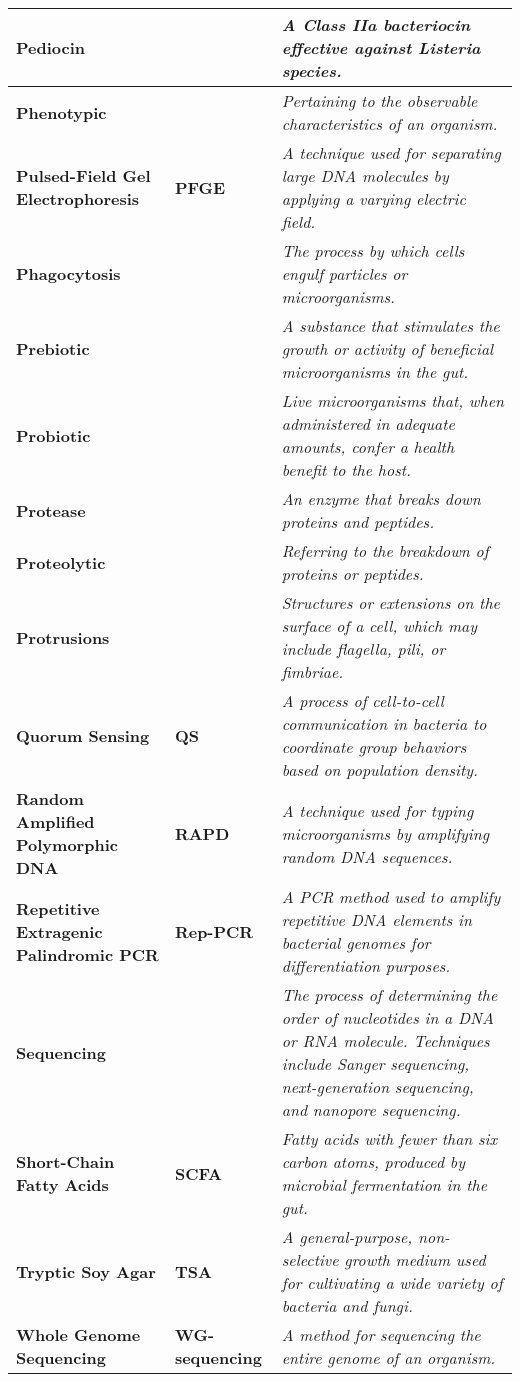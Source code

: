 \begin{longtable}{| p{5cm} | p{2cm} | p{7.5cm} |}
    \hline
    \textbf{Pediocin} &  & \textit{A Class IIa bacteriocin effective against \textit{Listeria} species.} \\
    \hline
    \textbf{Phenotypic} &  & \textit{Pertaining to the observable characteristics of an organism.} \\
    \hline
    \textbf{Pulsed-Field Gel Electrophoresis} & \textbf{PFGE} & \textit{A technique used for separating large DNA molecules by applying a varying electric field.} \\
    \hline
    \textbf{Phagocytosis} &  & \textit{The process by which cells engulf particles or microorganisms.} \\
    \hline
    \textbf{Prebiotic} &  & \textit{A substance that stimulates the growth or activity of beneficial microorganisms in the gut.} \\
    \hline
    \textbf{Probiotic} &  & \textit{Live microorganisms that, when administered in adequate amounts, confer a health benefit to the host.} \\
    \hline
    \textbf{Protease} &  & \textit{An enzyme that breaks down proteins and peptides.} \\
    \hline
    \textbf{Proteolytic} &  & \textit{Referring to the breakdown of proteins or peptides.} \\
    \hline
    \textbf{Protrusions} &  & \textit{Structures or extensions on the surface of a cell, which may include flagella, pili, or fimbriae.} \\
    \hline
    \textbf{Quorum Sensing} & \textbf{QS} & \textit{A process of cell-to-cell communication in bacteria to coordinate group behaviors based on population density.} \\
    \hline
    \textbf{Random Amplified Polymorphic DNA} & \textbf{RAPD} & \textit{A technique used for typing microorganisms by amplifying random DNA sequences.} \\
    \hline
    \textbf{Repetitive Extragenic Palindromic PCR} & \textbf{Rep-PCR} & \textit{A PCR method used to amplify repetitive DNA elements in bacterial genomes for differentiation purposes.} \\
    \hline
    \textbf{Sequencing} &  & \textit{The process of determining the order of nucleotides in a DNA or RNA molecule. Techniques include Sanger sequencing, next-generation sequencing, and nanopore sequencing.} \\
    \hline
    \textbf{Short-Chain Fatty Acids} & \textbf{SCFA} & \textit{Fatty acids with fewer than six carbon atoms, produced by microbial fermentation in the gut.} \\
    \hline
    \textbf{Tryptic Soy Agar} & \textbf{TSA} & \textit{A general-purpose, non-selective growth medium used for cultivating a wide variety of bacteria and fungi.} \\
    \hline
    \textbf{Whole Genome Sequencing} & \textbf{WG-sequencing} & \textit{A method for sequencing the entire genome of an organism.} \\
    \end{longtable}


